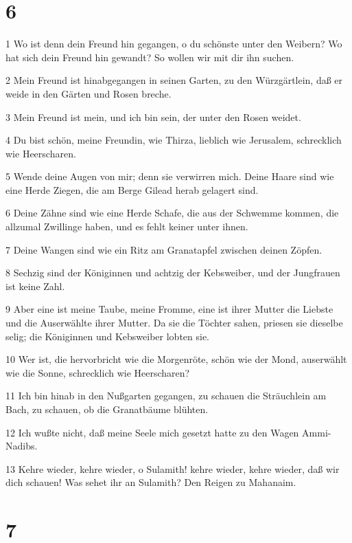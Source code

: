 \chapter{6}

\par 1 Wo ist denn dein Freund hin gegangen, o du schönste unter den Weibern? Wo hat sich dein Freund hin gewandt? So wollen wir mit dir ihn suchen.
\par 2 Mein Freund ist hinabgegangen in seinen Garten, zu den Würzgärtlein, daß er weide in den Gärten und Rosen breche.
\par 3 Mein Freund ist mein, und ich bin sein, der unter den Rosen weidet.
\par 4 Du bist schön, meine Freundin, wie Thirza, lieblich wie Jerusalem, schrecklich wie Heerscharen.
\par 5 Wende deine Augen von mir; denn sie verwirren mich. Deine Haare sind wie eine Herde Ziegen, die am Berge Gilead herab gelagert sind.
\par 6 Deine Zähne sind wie eine Herde Schafe, die aus der Schwemme kommen, die allzumal Zwillinge haben, und es fehlt keiner unter ihnen.
\par 7 Deine Wangen sind wie ein Ritz am Granatapfel zwischen deinen Zöpfen.
\par 8 Sechzig sind der Königinnen und achtzig der Kebsweiber, und der Jungfrauen ist keine Zahl.
\par 9 Aber eine ist meine Taube, meine Fromme, eine ist ihrer Mutter die Liebste und die Auserwählte ihrer Mutter. Da sie die Töchter sahen, priesen sie dieselbe selig; die Königinnen und Kebsweiber lobten sie.
\par 10 Wer ist, die hervorbricht wie die Morgenröte, schön wie der Mond, auserwählt wie die Sonne, schrecklich wie Heerscharen?
\par 11 Ich bin hinab in den Nußgarten gegangen, zu schauen die Sträuchlein am Bach, zu schauen, ob die Granatbäume blühten.
\par 12 Ich wußte nicht, daß meine Seele mich gesetzt hatte zu den Wagen Ammi-Nadibs.
\par 13 Kehre wieder, kehre wieder, o Sulamith! kehre wieder, kehre wieder, daß wir dich schauen! Was sehet ihr an Sulamith? Den Reigen zu Mahanaim.

\chapter{7}

